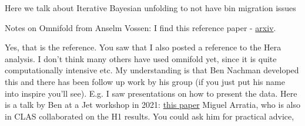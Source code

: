 Here we talk about Iterative Bayesian unfolding to not have bin migration issues

Notes on Omnifold from Anselm Vossen:
I find this reference paper - \href{https://arxiv.org/pdf/1911.09107.pdf}{arxiv}.




Yes, that is the reference. You saw that I also posted a reference to the Hera analysis. I don’t think many others have used omnifold yet, since it is quite computationally intensive etc.
My understanding is that Ben Nachman developed this and there has been follow up work by his group (if you just put his name into inspire you’ll see). E.g. I saw presentations on how to present the data. Here is a talk by Ben at a Jet workshop in 2021: \href{https://indico.bnl.gov/event/10555/contributions/54721/attachments/37368/61570/H1Measurement_EICWorkshopSeptember2021.pdf}{this paper}
 Miguel Arratia, who is also in CLAS collaborated on the H1 results. You could ask him for practical advice,
